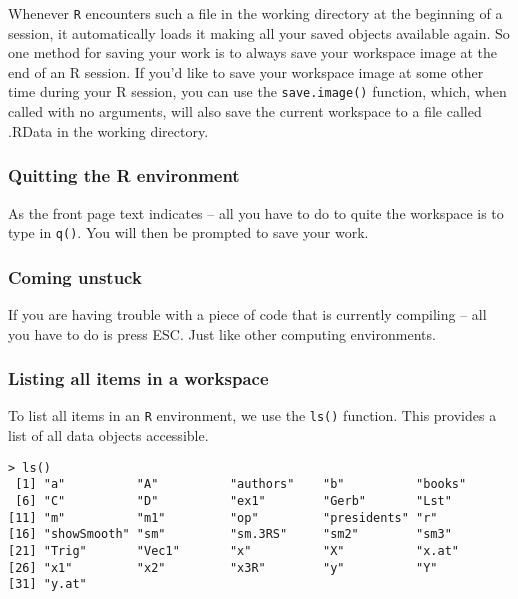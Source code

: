 \documentclass{beamer}
\begin{document}
\begin{frame}[fragile]
Whenever \texttt{R} encounters such a file in the working directory at the beginning of a session, it automatically loads it making all your saved objects available again. 
So one method for saving your work is to always save your workspace image at the end of an R session. If you’d like to save your workspace image at some other time during your R session, you can use the \texttt{save.image()} function, which, when called with no arguments, will also save the current workspace to a file called .RData in the working directory.
\end{frame}
\begin{frame}[fragile]
\frametitle{Quitting the R environment}
As the front page text indicates – all you have to do to quite the workspace is to type in \texttt{q()}. You will then be prompted to save your work.
\end{frame}
\begin{frame}[fragile]

\frametitle{Coming unstuck}
If you are having trouble with a piece of code that is currently compiling – all you have to do is press ESC. Just like other computing environments.
\end{frame}
\begin{frame}[fragile]
\frametitle{Listing all items in a workspace}
To list all items in an \texttt{R} environment, we use the \texttt{ls()} function. This provides a list of all data objects  accessible.
\begin{framed}
\begin{verbatim}
> ls()
 [1] "a"          "A"          "authors"    "b"          "books"     
 [6] "C"          "D"          "ex1"        "Gerb"       "Lst"       
[11] "m"          "m1"         "op"         "presidents" "r"         
[16] "showSmooth" "sm"         "sm.3RS"     "sm2"        "sm3"       
[21] "Trig"       "Vec1"       "x"          "X"          "x.at"      
[26] "x1"         "x2"         "x3R"        "y"          "Y"         
[31] "y.at"      
\end{verbatim}
\end{framed}
\end{frame}
\end{document}

